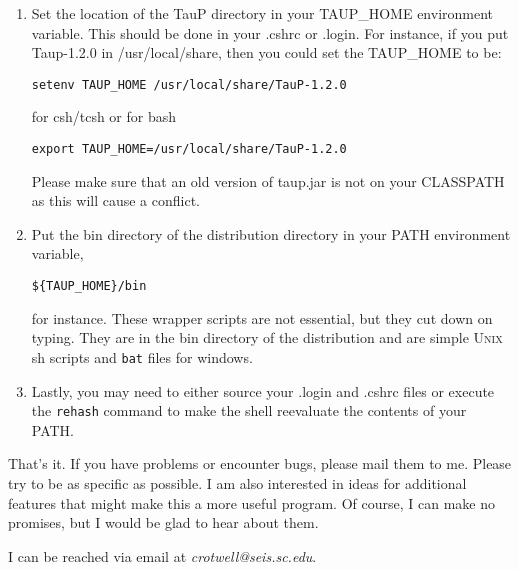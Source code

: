 \begin{enumerate}
\item Set the location of the TauP directory in your TAUP\_HOME environment variable.
This should be done in your .cshrc or .login. For instance, if you put Taup-1.2.0 in
/usr/local/share, then you could set the TAUP\_HOME to be:
\begin{verbatim}
setenv TAUP_HOME /usr/local/share/TauP-1.2.0
\end{verbatim} 
for csh/tcsh or for bash
\begin{verbatim}
export TAUP_HOME=/usr/local/share/TauP-1.2.0
\end{verbatim} 

Please make sure that an old version of taup.jar is not on your CLASSPATH as this will cause a 
conflict.

\item Put the bin directory of the distribution directory in your PATH environment
variable, \begin{verbatim}${TAUP_HOME}/bin\end{verbatim} for instance. These wrapper 
scripts are not essential, but they cut down on 
typing. They are in the bin directory of the distribution 
and are simple \textsc{Unix} sh scripts and \texttt{bat} files for windows.

\item Lastly, you may need to either source your .login and .cshrc files or
execute the \texttt{rehash} command to make the shell reevaluate the 
contents of your PATH.

\end{enumerate}

That's it. If you have problems or encounter bugs, please mail them to me.
Please try to be as specific as possible. I am also interested in ideas for
additional features that might make this a more useful program. 
Of course, I can make no promises,
but I would be glad to hear about them.

I can be reached via email at \textit{crotwell@seis.sc.edu}.

